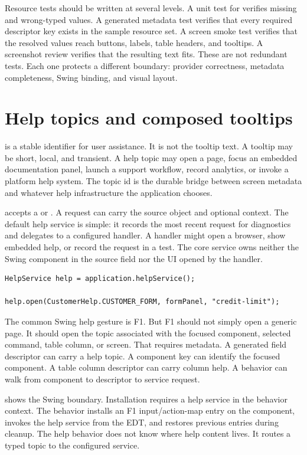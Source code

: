 Resource tests should be written at several levels. A unit test for
 verifies missing and wrong-typed values. A generated
metadata test verifies that every required descriptor key exists in the sample
resource set. A screen smoke test verifies that the resolved values reach
buttons, labels, table headers, and tooltips. A screenshot review verifies
that the resulting text fits. These are not redundant tests. Each one protects
a different boundary: provider correctness, metadata completeness, Swing
binding, and visual layout.

\section{Help topics and composed tooltips}

 is a stable identifier for user assistance.
It is not the tooltip text. A tooltip may be short, local, and transient. A
help topic may open a page, focus an embedded documentation panel, launch a
support workflow, record analytics, or invoke a platform help system. The
topic id is the durable bridge between screen metadata and whatever help
infrastructure the application chooses.

 accepts a  or . A request
can carry the source object and optional context. The default help service is
simple: it records the most recent request for diagnostics and delegates to a
configured handler. A handler might open a browser, show embedded help, or
record the request in a test. The core service owns neither the Swing
component in the source field nor the UI opened by the handler.

\begin{lstlisting}[caption={Opening typed help.}]
HelpService help = application.helpService();

help.open(CustomerHelp.CUSTOMER_FORM, formPanel, "credit-limit");
\end{lstlisting}

The common Swing help gesture is F1. But F1 should not simply open a generic
page. It should open the topic associated with the focused component, selected
command, table column, or screen. That requires metadata. A generated field
descriptor can carry a help topic. A component key can identify the focused
component. A table column descriptor can carry column help. A behavior can walk
from component to descriptor to service request.

 shows the Swing boundary. Installation
requires a help service in the behavior context. The behavior installs an F1
input/action-map entry on the component, invokes the help service from the EDT,
and restores previous entries during cleanup. The help behavior does not know
where help content lives. It routes a typed topic to the configured service.

